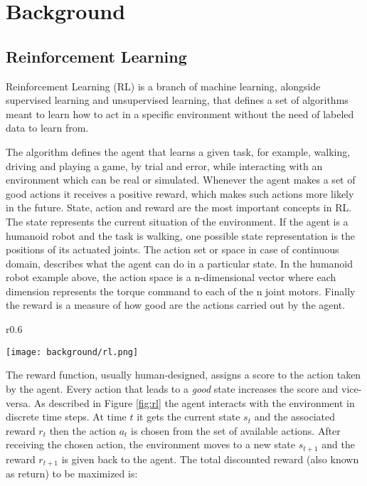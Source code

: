 \chapter{Background}

\section{Reinforcement Learning}

Reinforcement Learning (RL) is a branch of machine learning, alongside supervised learning and unsupervised learning, that defines a set of algorithms meant to learn how to act in a specific environment without the need of labeled data to learn from. 

The algorithm defines the agent that learns a given task, for example, walking, driving and playing a game, by trial and error, while interacting with an environment which can be real or simulated. Whenever the agent makes a set of good actions it receives a positive reward, which makes such actions more likely in the future. State, action and reward are the most important concepts in RL. The state represents the current situation of the environment. If the agent is a humanoid robot and the task is walking, one possible state representation is the positions of its actuated joints. The action set or space in case of continuous domain, describes what the agent can do in a particular state. In the humanoid robot example above, the action space is a n-dimensional vector where each dimension represents the torque command to each of the n joint motors. Finally the reward is a measure of how good are the actions carried out by the agent. 

\begin{wrapfigure}{r}{0.6\textwidth}
  \begin{center}
    \texttt{[image: background/rl.png]}
  \end{center}
  \caption{Reinforcement Learning loop}
  \label{fig:rl}
\end{wrapfigure}

The reward function, usually human-designed, assigns a score to the action taken by the agent. Every action that leads to a \textit{good} state increases the score and vice-versa. As described in Figure \ref{fig:rl} the agent interacts with the environment in discrete time steps. At time $t$ it gets the current state $s_{t}$ and the associated reward $r_{t}$ then the action $a_{t}$ is chosen from the set of available actions. After receiving the chosen action, the environment moves to a new state $s_{t+1}$ and the reward $r_{t+1}$ is given back to the agent. The total discounted reward (also known as return) to be maximized is:

